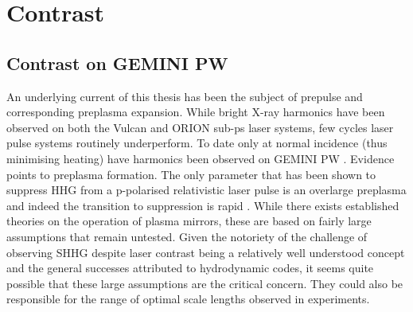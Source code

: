 \section{Contrast}\label{sec:ch4-contrast}


\subsection{Contrast on GEMINI PW}

An underlying current of this thesis has been the subject of prepulse and corresponding preplasma expansion. While bright X-ray harmonics have been observed on both the Vulcan \cite{dromeyBrightMultikeVHarmonic2007} and ORION sub-ps laser systems, few cycles laser pulse systems routinely underperform. To date only at normal incidence (thus minimising heating) have harmonics been observed on GEMINI PW \cite{dromeyCoherentSynchrotronEmission2013}. Evidence points to preplasma formation. The only parameter that has been shown to suppress HHG from a p-polarised relativistic laser pulse is an overlarge preplasma \cite{dollarScalingHighorderHarmonic2013} and indeed the transition to suppression is rapid \cite{kahalyDirectObservationDensityGradient2013}. While there exists established theories on the operation of plasma mirrors, these are based on fairly large assumptions that remain untested. Given the notoriety of the challenge of observing SHHG despite laser contrast being a relatively well understood concept and the general successes attributed to hydrodynamic codes, it seems quite possible that these large assumptions are the critical concern. They could also be responsible for the range of optimal scale lengths observed in experiments. 

